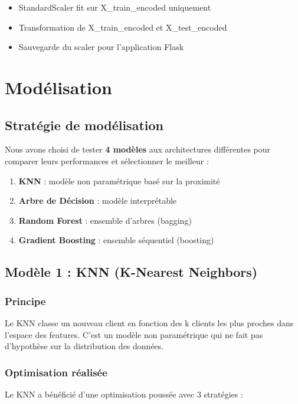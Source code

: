 \documentclass[11pt,a4paper]{article}
\begin{document}
\begin{tcolorbox}[title=�� Normalisation après split]
\begin{itemize}
    \item StandardScaler fit sur X\_train\_encoded uniquement
    \item Transformation de X\_train\_encoded et X\_test\_encoded
    \item Sauvegarde du scaler pour l'application Flask
\end{itemize}
\end{tcolorbox}

\newpage
\section{Modélisation}

\subsection{Stratégie de modélisation}
Nous avons choisi de tester \textbf{4 modèles} aux architectures différentes pour 
comparer leurs performances et sélectionner le meilleur :

\begin{enumerate}
    \item \textbf{KNN} : modèle non paramétrique basé sur la proximité
    \item \textbf{Arbre de Décision} : modèle interprétable
    \item \textbf{Random Forest} : ensemble d'arbres (bagging)
    \item \textbf{Gradient Boosting} : ensemble séquentiel (boosting)
\end{enumerate}

\subsection{Modèle 1 : KNN (K-Nearest Neighbors)}

\subsubsection{Principe}
Le KNN classe un nouveau client en fonction des k clients les plus proches dans 
l'espace des features. C'est un modèle non paramétrique qui ne fait pas d'hypothèse 
sur la distribution des données.

\subsubsection{Optimisation réalisée}
Le KNN a bénéficié d'une optimisation poussée avec 3 stratégies :
\end{document}
